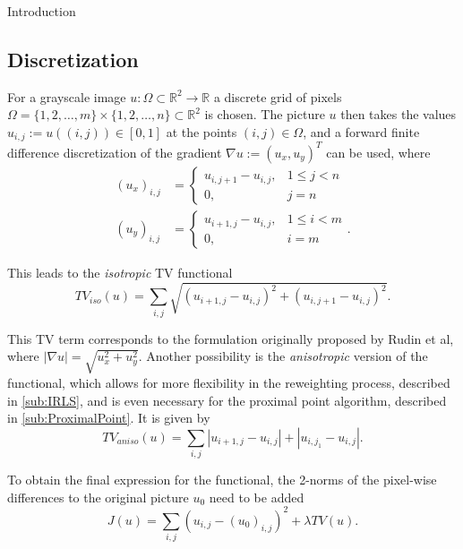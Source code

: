 \begin{chapter}{Introduction}
\subsection{Discretization} %
\label{sub:Discretization}
For a grayscale image $u:\Omega\subset\mathbb{R}^2\to\mathbb{R}$ a discrete grid of pixels 
$\Omega=\lbrace 1,2,\ldots,m\rbrace\times\lbrace1,2,\ldots,n\rbrace\subset\mathbb{R}^2$ is chosen. The picture $u$ then takes the values $u_{i,j}:=u((i,j))\in [0,1]$
at the points $(i,j)\in\Omega$, and a forward finite difference discretization of the gradient $\nabla u:=(u_x,u_y)^T$ can be used, where
\begin{align}
    (u_x)_{i,j} &= 
	\begin{cases}
	u_{i,j+1}-u_{i,j}, & 1\leq j < n \\
	0, & j=n 
	\end{cases} \\
    (u_y)_{i,j} &= 
	\begin{cases}
	u_{i+1,j}-u_{i,j}, & 1\leq i < m \\
	0, &i=m
	\end{cases}.\nonumber
\end{align}

This leads to the \emph{isotropic} TV functional
\begin{equation}
    \label{eq:original_isofunctional}
    TV_{iso}(u)=\sum_{i,j}\sqrt{(u_{i+1,j}-u_{i,j})^{2}+(u_{i,j+1}-u_{i,j})^{2}}.
\end{equation}

This TV term corresponds to the formulation originally proposed by Rudin et al\cite{RudinOsher}, where $\left\vert\nabla u\right\vert=\sqrt{u_x^{2}+u_y^{2} }$.
Another possibility is the \emph{anisotropic} version of the functional, which allows for more flexibility in the reweighting process, described in \ref{sub:IRLS}, and is even necessary for the proximal point algorithm, described in \ref{sub:ProximalPoint}.
It is given by
\begin{equation}
    \label{eq:original_anisofunctional}
    TV_{aniso}(u)=\sum_{i,j}|u_{i+1,j}-u_{i,j}|+|u_{i,j_1}-u_{i,j}|.
\end{equation}

To obtain the final expression for the functional, the 2-norms of the pixel-wise differences to the original picture $u_0$ need to be added
\begin{equation}
    \label{eq:original_functional}
    J(u)=\sum_{i,j}(u_{i,j}-(u_0)_{i,j})^2 + \lambda TV(u).
\end{equation}



\end{chapter}

